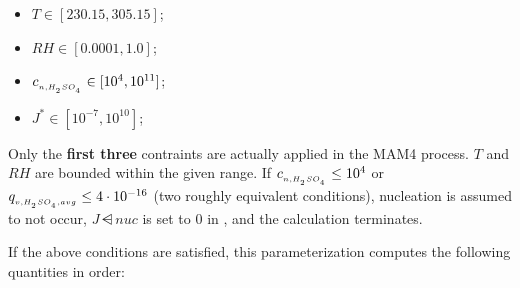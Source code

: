\begin{itemize}
  \item $T \in [230.15, 305.15]$;
  \item $RH \in [0.0001, 1.0]$;
  \item $c_{_{n,H_{_2}SO_{_4}}} \in [10^4, 10^{11}]$;
  \item $J^* \in [10^{-7}, 10^{10}]$;
\end{itemize}

Only the \textbf{first three} contraints are actually applied in the MAM4
process. $T$ and $RH$ are bounded within the given range. If
$c_{_{n,H_{_2}SO_{_4}}} \le 10^4$ or $q_{_{v,H_{_2}SO_{_4},avg}} \le 4 \cdot 10^{-16}$
(two roughly equivalent conditions), nucleation is assumed to not occur,
$J\dsub{nuc}$ is set to $0$ in , and the calculation
terminates.

If the above conditions are satisfied, this parameterization computes the
following quantities in order:

